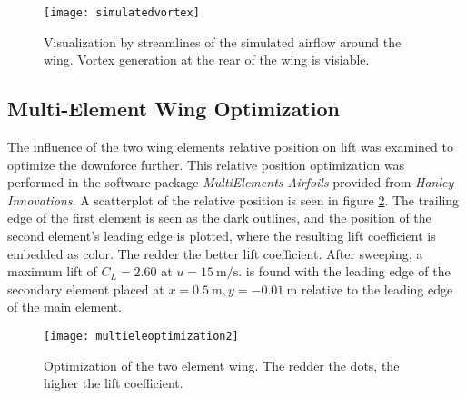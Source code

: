   \begin{figure}
    \texttt{[image: simulatedvortex]}
    \caption{Visualization by streamlines of the simulated airflow around the wing. Vortex generation at the rear of the wing is visiable.}
    \label{fig:simvortex}
  \end{figure}

  \subsection{Multi-Element Wing Optimization}
  The influence of the two wing elements relative position on lift was examined to optimize the downforce further. This relative position optimization was performed in the software package \emph{MultiElements Airfoils} provided from \emph{Hanley Innovations}. A scatterplot of the relative position is seen in figure \ref{fig:multieleoptimization}. The trailing edge of the first element is seen as the dark outlines, and the position of the second element's leading edge is plotted, where the resulting lift coefficient is embedded as color. The redder the better lift coefficient. After sweeping, a maximum lift of $C_L = 2.60$  at $u = \SI{15}{\metre\per\second}$. is found with the leading edge of the secondary element placed at $x=\SI{0.5}{\metre},y=\SI{-0.01}{\metre}$ relative to the leading edge of the main element.

  \begin{figure}
    \texttt{[image: multieleoptimization2]}
    \caption{Optimization of the two element wing. The redder the dots, the higher the lift coefficient.}
    \label{fig:multieleoptimization}
  \end{figure}
